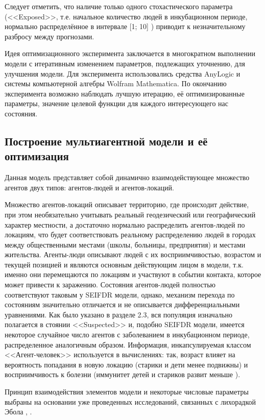 Следует отметить, что наличие только одного стохастического параметра (<<Exposed>>,  т.е. начальное количество людей в инкубационном периоде, нормально распределённое в интервале [1; 10] ) приводит  к незначительному разбросу между прогнозами.

Идея  оптимизационного  эксперимента заключается в многократном выполнении модели с итеративным изменением параметров, подлежащих уточнению, для улучшения модели. Для эксперимента использовались средства AnyLogic  и системы компьютерной алгебры Wolfram Mathematica. По окончанию эксперимента возможно наблюдать лучшую итерацию, её оптимизированные параметры, значение целевой функции для каждого интересующего нас состояния.

\subsection{Построение мультиагентной модели и её оптимизация}

Данная модель представляет собой динамично взаимодействующее множество агентов двух типов: агентов-людей и агентов-локаций. 

Множество агентов-локаций описывает территорию, где происходит действие, при этом необязательно учитывать реальный геодезический или географический характер местности, а достаточно нормально распределить агентов-людей по локациям, что будет соответствовать реальному распределению людей в городах между общественными местами (школы, больницы, предприятия) и местами жительства.    Агенты-люди описывают людей с их восприимчивостью, возрастом и текущей позицией и являются основным действующим лицом в модели,  т.к. именно они перемещаются по локациям и участвуют в событии контакта, которое может привести к заражению. Состояния агентов-людей полностью соответствуют таковым у SEIFDR модели, однако, механизм перехода по состояниям значительно отличается и не описывается дифференциальными уравнениями. Как было указано в разделе 2.3, вся популяция изначально полагается в стоянии  <<Suspected>> и, подобно SEIFDR модели, имеется некоторое случайное число агентов с заболеванием в инкубационном периоде, распределенное аналогичным образом. Информация, инкапсулируемая классом <<Агент-человек>> используется в вычислениях: так, возраст влияет на вероятность попадания в новую локацию (старики и дети менее подвижны) и восприимчивость к болезни (иммунитет детей и стариков развит меньше %
\cite{Parahonsky:2011}).

Принцип взаимодействия элементов модели и некоторые числовые параметры выбраны на основании уже проведенных исследований, связанных с лихорадкой Эбола
\cite{Plos_Outbreak:1}, \cite{Plos_Outbreak:2}. 

